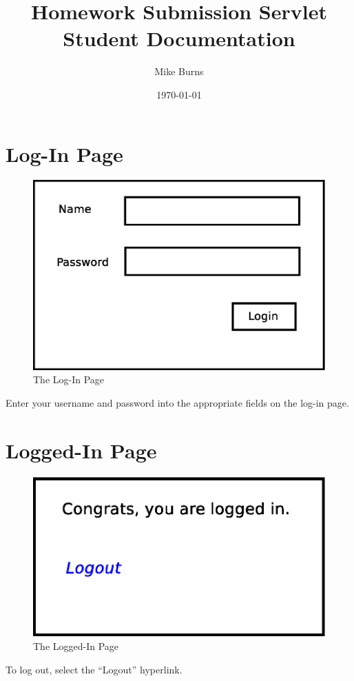 \documentclass{article}
\begin{document}
\title{Homework Submission Servlet Student Documentation}
\author{Mike Burns}
\date{\today}

\maketitle

\section{Log-In Page}\label{sec:login}

\begin{figure}[h]
\centering
\includegraphics[scale=.35]{login.eps}
\caption{The Log-In Page}
\label{fig:login}
\end{figure}

Enter your username and password into the appropriate fields on the log-in
page.

\section{Logged-In Page}\label{sec:logged-in}

\begin{figure}[h]
\centering
\includegraphics[scale=.35]{logged-in.eps}
\caption{The Logged-In Page}
\label{fig:logged-in}
\end{figure}

To log out, select the ``Logout'' hyperlink.
\end{document}
